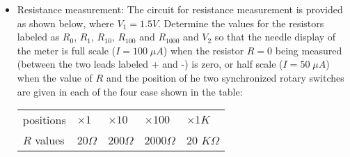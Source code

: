 \begin{itemize}
\begin{enumerate}
\begin{itemize}


  \item Resistance measurement: The circuit for resistance measurement is
    provided as shown below, where $V_1=1.5V$. Determine the values for the 
    resistors labeled as $R_0$, $R_1$, $R_{10}$, $R_{100}$ and $R_{1000}$ 
    and $V_2$ so that the needle display of the meter is full scale 
    ($I=100\;\mu A$) when the resistor $R=0$ being measured (between the 
    two leads labeled + and -) is zero, or half scale ($I=50\;\mu A$) when 
    the value of $R$ and the position of he two synchronized rotary switches
    are given in each of the four case shown in the table:

    \begin{tabular}{l|llll} \hline
      positions  & $\times 1$ & $\times 10$ & $\times 100$ & $\times 1K$ \\
      $R$ values & 20$\Omega$ & 200$\Omega$ & 2000$\Omega$ & 20 $K\Omega$ 
    \end{tabular}



\end{itemize}
\end{enumerate}
\end{itemize}
